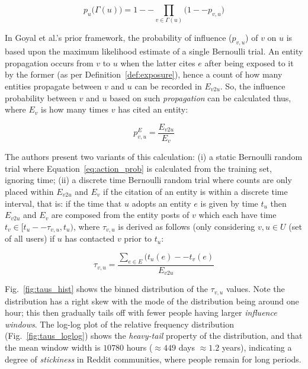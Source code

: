 \documentclass[sigconf]{acmart}
\begin{document}
\begin{equation}
\label{eq:joint_prob}
p_u\big(\Gamma(u)\big) = 1 -- \displaystyle\prod_{v \in \Gamma(u)}\big(1 -- p_{v,u}\big)
\end{equation}

In Goyal et al.'s prior framework, the probability of influence ($p_{v,u}$) of $v$ on $u$ is based upon the maximum likelihood estimate of a single Bernoulli trial.
An entity propagation occurs from $v$ to $u$ when the latter cites $e$ after being exposed to it by the former (as per Definition~\ref{def:exposure}), hence a count of how many entities propagate between $v$ and $u$ can be recorded in $E_{v2u}$.
So, the influence probability between $v$ and $u$ based on such \emph{propagation} can be calculated thus, where $E_v$ is how many times $v$ has cited an entity:

\begin{equation}
\label{eq:action_prob}
p^{E}_{v,u} = \frac{E_{v2u}}{E_v}
\end{equation}

The authors present two variants of this calculation: (i) a static Bernoulli random trial where Equation~\ref{eq:action_prob} is calculated from the training set, ignoring time; (ii) a discrete time Bernoulli random trial where counts are only placed within $E_{v2u}$ and $E_v$ if the citation of an entity is within a discrete time interval, that is: if the time that $u$ adopts an entity $e$ is given by time $t_u$ then $E_{v2u}$ and $E_v$ are composed from the entity posts of $v$ which each have time $t_v \in [t_u -- \tau_{v,u}, t_u)$, where $\tau_{v,u}$ is derived as follows (only considering $v, u \in U$ (set of all users) if $u$ has contacted $v$ prior to $t_u$:

\begin{equation}
\tau_{v,u} = \frac{\displaystyle\sum_{e \in E} (t_u(e) -- t_v(e)}{E_{v2u}}
\end{equation}

Fig.~\ref{fig:taus_hist} shows the binned distribution of the $\tau_{v,u}$ values. Note the distribution has a right skew with the mode of the distribution being around one hour; this then gradually tails off with fewer people having larger \emph{influence windows}.
The log-log plot of the relative frequency distribution (Fig.~\ref{fig:taus_loglog}) shows the \emph{heavy-tail} property of the distribution, and that the mean window width is $10 780$ hours ($\approx 449$ days $\approx 1.2$ years), indicating a degree of \emph{stickiness} in Reddit communities, where people remain for long periods.
\end{document}
